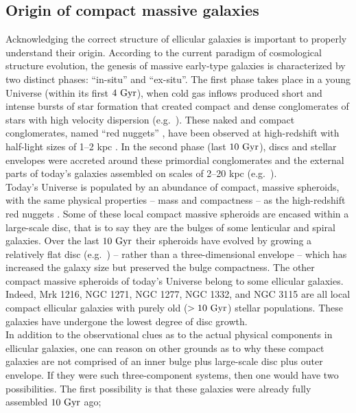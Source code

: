 \documentclass[useAMS,usenatbib,article]{mnras}
\begin{document}
\subsection{Origin of compact massive galaxies}
Acknowledging the correct structure of ellicular galaxies is important to properly understand their origin. 
According to the current paradigm of cosmological structure evolution, 
the genesis of massive early-type galaxies is characterized by two distinct phases: ``in-situ'' and ``ex-situ''. 
The first phase takes place in a young Universe (within its first $4~\rm Gyr$), 
when cold gas inflows produced short and intense bursts of star formation 
that created compact and dense conglomerates of stars with high velocity dispersion (e.g.~\citealt{prieto2013}). 
These naked and compact conglomerates, named ``red nuggets'' \citep{damjanov2009}, 
have been observed at high-redshift with half-light sizes of 1--2 kpc \citep{daddi2005,trujillo2006,vandokkum2008}.
In the second phase (last $10~\rm Gyr$), discs and stellar envelopes 
were accreted around these primordial conglomerates and the external parts of today's galaxies assembled on scales of 2--20 kpc 
(e.g.~\citealt{driver2013}). \\
Today's Universe is populated by an abundance of compact, massive spheroids, 
with the same physical properties -- mass and compactness -- as the high-redshift red nuggets \citep{graham2013review,GDS2015}. 
Some of these local compact massive spheroids are encased within a large-scale disc, 
that is to say they are the bulges of some lenticular and spiral galaxies.  
Over the last $10~\rm Gyr$ their spheroids have evolved by growing a relatively flat disc (e.g.~\citealt{pichon2011,danovich2012,stewart2013})
-- rather than a three-dimensional envelope -- 
which has increased the galaxy size but preserved the bulge compactness. 
The other compact massive spheroids of today's Universe belong to some ellicular galaxies. 
Indeed, Mrk 1216, NGC 1271, NGC 1277, NGC 1332, and NGC 3115 are all local compact ellicular galaxies 
with purely old ($>10~\rm Gyr$) stellar populations. 
These galaxies have undergone the lowest degree of disc growth. \\
In addition to the observational clues as to the actual physical components in ellicular galaxies, 
one can reason on other grounds as to why these compact galaxies are not comprised of an inner bulge 
plus large-scale disc plus outer envelope. 
If they were such three-component systems, then one would have two possibilities. 
The first possibility is that these galaxies were already fully assembled $10~\rm Gyr$ ago; 
\end{document}
